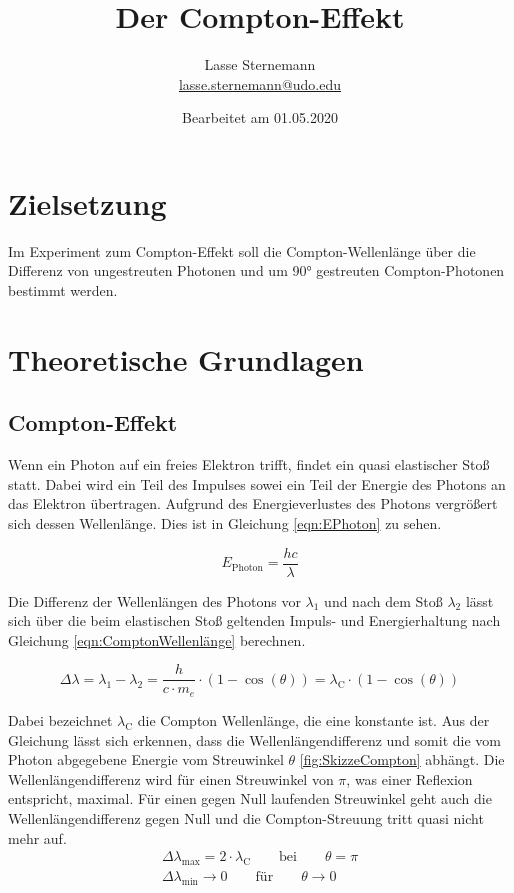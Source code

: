 \documentclass[titlepage = firstcover]{scrartcl}
\title{Der Compton-Effekt}
\author{
  Lasse Sternemann\\
  \href{mailto:lasse.sternemann@udo.edu}{lasse.sternemann@udo.edu}
}
\date{Bearbeitet am 01.05.2020}
\begin{document}
    \maketitle
    \newpage
    \tableofcontents
    \newpage
     
    \section{Zielsetzung}
    Im Experiment zum Compton-Effekt soll die Compton-Wellenlänge über die Differenz von ungestreuten Photonen und um 90° gestreuten Compton-Photonen
    bestimmt werden. 


    \section{Theoretische Grundlagen}
        \subsection{Compton-Effekt}
        Wenn ein Photon auf ein freies Elektron trifft, findet ein quasi elastischer Stoß statt. Dabei wird ein Teil des Impulses sowei ein Teil der 
        Energie des Photons an das Elektron übertragen. Aufgrund des Energieverlustes des Photons vergrößert sich dessen Wellenlänge. Dies ist in 
        Gleichung \ref{eqn:EPhoton} zu sehen.

        \begin{equation}
            E_{\text{Photon}} = \frac{hc}{\lambda}
            \label{eqn:EPhoton}
        \end{equation}
        \noindent

        Die Differenz der Wellenlängen des Photons vor $\lambda _1$ und nach dem Stoß $\lambda _2$ lässt sich über die beim elastischen Stoß geltenden
        Impuls- und Energierhaltung nach Gleichung \ref{eqn:ComptonWellenlänge} berechnen.

        \begin{equation}
            \Delta \lambda = \lambda_1 - \lambda_2 = \frac{h}{c \cdot m_e} \cdot \left(1-\cos(\theta)\right) = \lambda_{\text{C}} \cdot \left(1-\cos(\theta)\right)
            \label{eqn:ComptonWellenlänge}
        \end{equation}
        \noindent

        Dabei bezeichnet $\lambda_{\text{C}}$ die Compton Wellenlänge, die eine konstante ist. Aus der Gleichung lässt sich erkennen, dass die 
        Wellenlängendifferenz und somit die vom Photon abgegebene Energie vom Streuwinkel $\theta$ \ref{fig:SkizzeCompton} abhängt. Die Wellenlängendifferenz 
        wird für einen Streuwinkel von $\pi$, was einer Reflexion entspricht, maximal. Für einen gegen Null laufenden Streuwinkel geht auch die 
        Wellenlängendifferenz gegen Null und die Compton-Streuung tritt quasi nicht mehr auf.
        \begin{align*}
            \Delta \lambda_{\text{max}} = 2 \cdot \lambda_{\text{C}} \qquad \text{bei} \qquad \theta = \pi \\
            \Delta \lambda_{\text{min}} \longrightarrow 0 \qquad \text{für} \qquad \theta \longrightarrow 0
        \end{align*}
        \noindent
\end{document}
